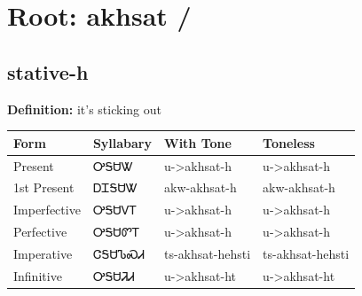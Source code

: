 \documentclass{article}%
\begin{document}
%
\normalsize%
\section*{Root: akhsat / }%
\subsection*{stative-h}%
\textbf{Definition: }%
it’s sticking out%
\\[0.5em]%
\begin{tabular}{|l|l|l|l|}%
\hline%
\textbf{Form}&\textbf{Syllabary}&\textbf{With Tone}&\textbf{Toneless}\\%
\hline%
Present&ᎤᎦᏌᏔ&u{-}>akhsat{-}h&u{-}>akhsat{-}h\\%
1st Present&ᎠᏆᎦᏌᏔ&akw{-}akhsat{-}h&akw{-}akhsat{-}h\\%
Imperfective&ᎤᎦᏌᏙᎢ&u{-}>akhsat{-}h&u{-}>akhsat{-}h\\%
Perfective&ᎤᎦᏌᏛᎢ&u{-}>akhsat{-}h&u{-}>akhsat{-}h\\%
Imperative&ᏣᎦᏌᏖᏍᏗ&ts{-}akhsat{-}hehsti&ts{-}akhsat{-}hehsti\\%
Infinitive&ᎤᎦᏌᏘᏗ&u{-}>akhsat{-}ht&u{-}>akhsat{-}ht\\%
\hline%
\end{tabular}%
\\[1em]%
\end{document}
